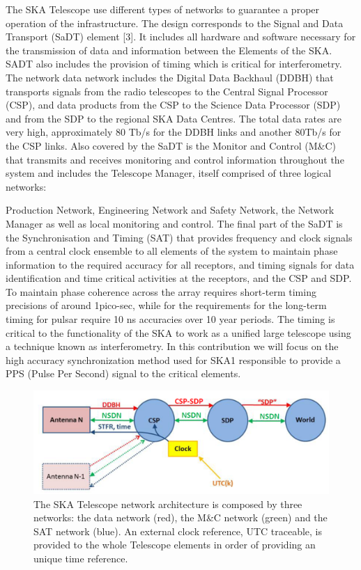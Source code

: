 \documentclass[review]{elsarticle}
\begin{document}
The SKA Telescope use different types of networks to guarantee a proper operation of the infrastructure. The design corresponds to the Signal and Data Transport (SaDT) element [3]. It includes all hardware and software necessary for the transmission of data and information between the Elements of the SKA. SADT also includes the provision of timing which is critical for interferometry.
The network data network includes the Digital Data Backhaul (DDBH) that transports signals from the radio telescopes to the Central Signal Processor (CSP), and data products from the CSP to the Science Data Processor (SDP) and from the SDP to the regional SKA Data Centres. The total data rates are very high, approximately 80 Tb/s for the DDBH links and another 80Tb/s for the CSP links. 
Also covered by the SaDT is the Monitor and Control (M\&C) that transmits and receives monitoring and control information throughout the system and includes the Telescope Manager, itself comprised of three logical networks:

Production Network, Engineering Network and Safety Network, the Network Manager as well as local monitoring and control.
The final part of the SaDT is the Synchronisation and Timing (SAT) that provides frequency and clock signals from a central clock ensemble to all elements of the system to maintain phase information to the required accuracy for all receptors, and timing signals for data identification and time critical activities at the receptors, and the CSP and SDP. To maintain phase coherence across the array requires short-term timing precisions of around 1pico-sec, while for the requirements for the long-term timing for pulsar require 10 ns accuracies over 10 year periods. The timing is critical to the functionality of the SKA to work as a unified large telescope using a technique known as interferometry. In this contribution we will focus on the high accuracy synchronization method used for SKA1 responsible to provide a PPS (Pulse Per Second) signal to the critical elements. 

\begin{figure}[h]
	\includegraphics[scale=0.4]{img/ska_network_arch}
	\caption{The SKA Telescope network architecture is composed by three networks: the data network (red), the M\&C network (green) and the SAT network (blue). An external clock reference, UTC traceable, is provided to the whole Telescope elements in order of providing an unique time reference.}
	\label{fig:ska_net_arch1}
\end{figure}
\end{document}
